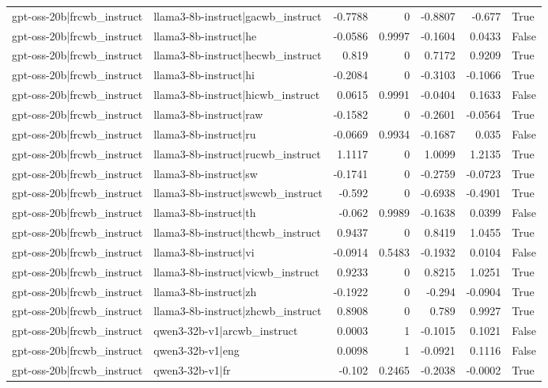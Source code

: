 \begin{table}
\begin{tabular}{l l r r r r l}
gpt-oss-20b|frcwb_instruct & llama3-8b-instruct|gacwb_instruct & -0.7788 & 0 & -0.8807 & -0.677 & True \\
gpt-oss-20b|frcwb_instruct & llama3-8b-instruct|he & -0.0586 & 0.9997 & -0.1604 & 0.0433 & False \\
gpt-oss-20b|frcwb_instruct & llama3-8b-instruct|hecwb_instruct & 0.819 & 0 & 0.7172 & 0.9209 & True \\
gpt-oss-20b|frcwb_instruct & llama3-8b-instruct|hi & -0.2084 & 0 & -0.3103 & -0.1066 & True \\
gpt-oss-20b|frcwb_instruct & llama3-8b-instruct|hicwb_instruct & 0.0615 & 0.9991 & -0.0404 & 0.1633 & False \\
gpt-oss-20b|frcwb_instruct & llama3-8b-instruct|raw & -0.1582 & 0 & -0.2601 & -0.0564 & True \\
gpt-oss-20b|frcwb_instruct & llama3-8b-instruct|ru & -0.0669 & 0.9934 & -0.1687 & 0.035 & False \\
gpt-oss-20b|frcwb_instruct & llama3-8b-instruct|rucwb_instruct & 1.1117 & 0 & 1.0099 & 1.2135 & True \\
gpt-oss-20b|frcwb_instruct & llama3-8b-instruct|sw & -0.1741 & 0 & -0.2759 & -0.0723 & True \\
gpt-oss-20b|frcwb_instruct & llama3-8b-instruct|swcwb_instruct & -0.592 & 0 & -0.6938 & -0.4901 & True \\
gpt-oss-20b|frcwb_instruct & llama3-8b-instruct|th & -0.062 & 0.9989 & -0.1638 & 0.0399 & False \\
gpt-oss-20b|frcwb_instruct & llama3-8b-instruct|thcwb_instruct & 0.9437 & 0 & 0.8419 & 1.0455 & True \\
gpt-oss-20b|frcwb_instruct & llama3-8b-instruct|vi & -0.0914 & 0.5483 & -0.1932 & 0.0104 & False \\
gpt-oss-20b|frcwb_instruct & llama3-8b-instruct|vicwb_instruct & 0.9233 & 0 & 0.8215 & 1.0251 & True \\
gpt-oss-20b|frcwb_instruct & llama3-8b-instruct|zh & -0.1922 & 0 & -0.294 & -0.0904 & True \\
gpt-oss-20b|frcwb_instruct & llama3-8b-instruct|zhcwb_instruct & 0.8908 & 0 & 0.789 & 0.9927 & True \\
gpt-oss-20b|frcwb_instruct & qwen3-32b-v1|arcwb_instruct & 0.0003 & 1 & -0.1015 & 0.1021 & False \\
gpt-oss-20b|frcwb_instruct & qwen3-32b-v1|eng & 0.0098 & 1 & -0.0921 & 0.1116 & False \\
gpt-oss-20b|frcwb_instruct & qwen3-32b-v1|fr & -0.102 & 0.2465 & -0.2038 & -0.0002 & True \\

\end{tabular}
\end{table}
